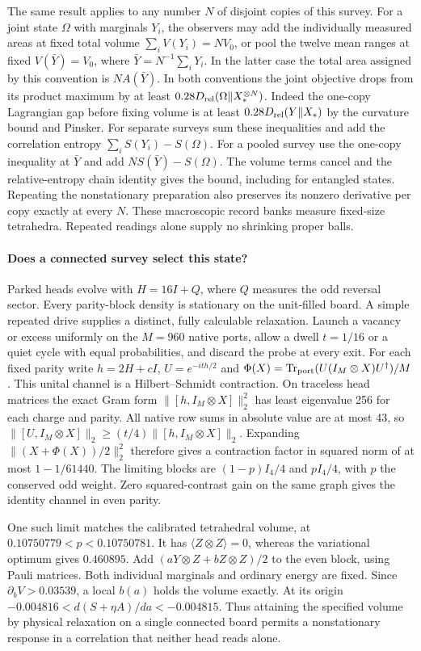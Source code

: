\documentclass[11pt]{article}
\begin{document}
The same result applies to any number $N$ of disjoint copies of this
survey. For a joint state $\Omega$ with marginals $Y_i$, the observers
may add the individually measured areas at fixed total volume
$\sum_i V(Y_i)=NV_0$, or pool the twelve mean ranges at fixed
$V(\bar Y)=V_0$, where $\bar Y=N^{-1}\sum_i Y_i$. In the latter
case the total area assigned by this convention is $NA(\bar Y)$.
In both conventions the joint objective drops from its product maximum
by at least $0.28D_{\rm rel}(\Omega\|X_*^{\otimes N})$.
Indeed the one-copy Lagrangian gap before fixing volume is at least
$0.28D_{\rm rel}(Y\|X_*)$ by the curvature bound and Pinsker.
For separate surveys sum these inequalities and add the correlation
entropy $\sum_i S(Y_i)-S(\Omega)$. For a pooled survey use the
one-copy inequality at $\bar Y$ and add $NS(\bar Y)-S(\Omega)$.
The volume terms cancel and the relative-entropy chain identity gives
the bound, including for entangled states. Repeating the nonstationary
preparation also preserves its nonzero derivative per copy exactly
at every $N$. These macroscopic record banks measure fixed-size
tetrahedra. Repeated readings alone supply no shrinking proper balls.

\paragraph{Does a connected survey select this state?}
Parked heads evolve with $H=16I+Q$, where $Q$ measures the odd
reversal sector. Every parity-block density is stationary on the
unit-filled board. A simple repeated drive supplies a distinct,
fully calculable relaxation. Launch a vacancy or excess uniformly
on the $M=960$ native ports, allow a dwell $t=1/16$ or a quiet
cycle with equal probabilities, and discard the probe at every exit.
For each fixed parity write $h=2H+cI$, $U=e^{-ith/2}$ and
$\Phi(X)=\operatorname{Tr}_{\rm port}(U(I_M\otimes X)U^\dagger)/M$.
This unital channel is a Hilbert--Schmidt contraction. On traceless
head matrices the exact Gram form $\|[h,I_M\otimes X]\|_2^2$ has
least eigenvalue 256 for each charge and parity. All native row sums
in absolute value are at most 43, so
$\|[U,I_M\otimes X]\|_2\ge(t/4)\|[h,I_M\otimes X]\|_2$.
Expanding $\|(X+\Phi(X))/2\|_2^2$ therefore gives a contraction
factor in squared norm of at most $1-1/61440$.
The limiting blocks are $(1-p)I_4/4$ and $pI_4/4$, with $p$
the conserved odd weight. Zero squared-contrast gain on the same
graph gives the identity channel in even parity.

One such limit matches the calibrated tetrahedral volume, at
$0.10750779<p<0.10750781$. It has $\langle Z\otimes Z\rangle=0$,
whereas the variational optimum gives $0.460895$.
Add $(aY\otimes Z+bZ\otimes Z)/2$ to the even block, using Pauli
matrices. Both individual marginals and ordinary energy are fixed.
Since $\partial_b V>0.03539$, a local $b(a)$ holds the volume exactly.
At its origin $-0.004816<d(S+\eta A)/da<-0.004815$.
Thus attaining the specified volume by physical relaxation on a single
connected board permits a nonstationary response in a correlation
that neither head reads alone.
\end{document}
